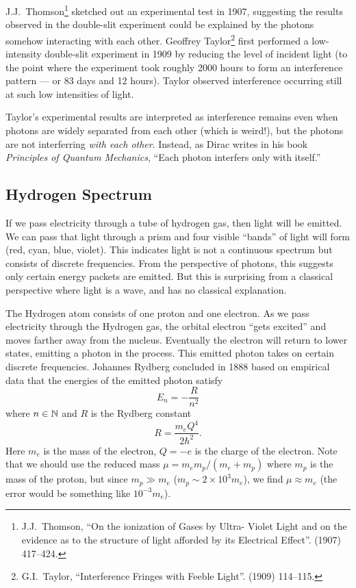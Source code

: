 J.J.~Thomson\footnote{J.J.~Thomson, ``On the ionization of Gases by
Ultra- Violet Light and on the evidence as to the structure of light
afforded by its Electrical Effect''. 
 (1907) 417--424.} sketched out an experimental test in 1907, 
suggesting the results observed in the double-slit experiment could be
explained by the photons somehow interacting with each other.
Geoffrey Taylor\footnote{G.I.~Taylor, ``Interference Fringes with Feeble
Light''.   (1909) 114--115.}
first performed a low-intensity double-slit experiment
in 1909 by reducing the level of incident light (to the point where the
experiment took roughly 2000 hours to form an interference pattern ---
or 83 days and 12 hours). Taylor observed interference occurring still
at such low intensities of light.

Taylor's experimental results are interpreted as interference remains
even when photons are widely separated from each other (which is
weird!), but the photons are not interferring \emph{with each other}.
Instead, as Dirac writes in his book \textit{Principles of Quantum Mechanics},
``Each photon interfers only with itself.''

\subsection{Hydrogen Spectrum}

If we pass electricity through a tube of hydrogen gas, then light will
be emitted. We can pass that light through a prism and four visible
``bands'' of light will form (red, cyan, blue, violet). This indicates
light is not a continuous spectrum but consists of discrete
frequencies. From the perspective of photons, this suggests only certain
energy packets are emitted. But this is surprising from a classical
perspective where light is a wave, and has no classical explanation.

The Hydrogen atom consists of one proton and one electron. As we pass
electricity through the Hydrogen gas, the orbital electron ``gets
excited'' and moves farther away from the nucleus. Eventually the
electron will return to lower states, emitting a photon in the
process. This emitted photon takes on certain discrete
frequencies. Johannes Rydberg concluded in 1888 based on empirical data
that the energies of the emitted photon satisfy
\begin{equation}
E_{n} = -\frac{R}{n^{2}}
\end{equation}
where $n\in\mathbb{N}$ and $R$ is the Rydberg constant
\begin{equation}
R = \frac{m_{e}Q^{4}}{2\hbar^{2}}.
\end{equation}
Here $m_{e}$ is the mass of the electron, $Q=-e$ is the charge of the
electron.
Note that we should use the reduced mass $\mu=m_{e}m_{p}/(m_{e}+m_{p})$
where $m_{p}$ is the mass of the proton,
but since $m_{p}\gg m_{e}$ ($m_{p}\sim 2\times10^{3}m_{e}$), we find
$\mu\approx m_{e}$ (the error would be something like $10^{-3}m_{e}$).

